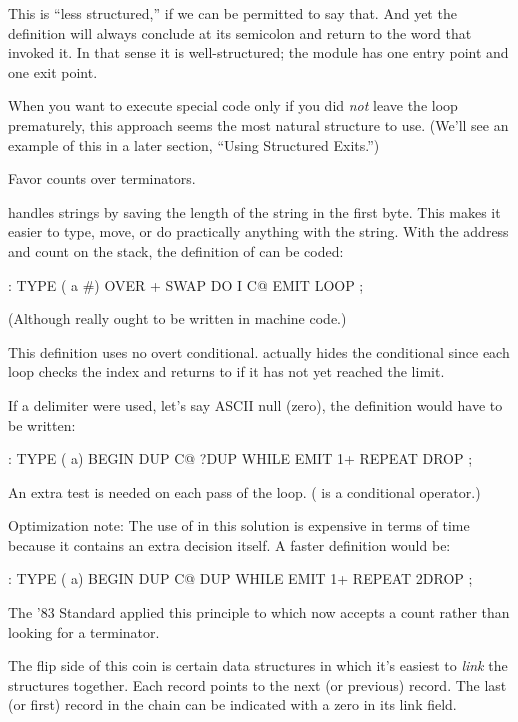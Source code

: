 This is ``less structured,'' if we can be permitted to say that. And
yet the definition will always conclude at its semicolon and return to the
word that invoked it. In that sense it is well-structured; the module has
one entry point and one exit point.

When you want to execute special code only if you did \emph{not} leave the
loop prematurely, this approach seems the most natural structure to use.
(We'll see an example of this in a later section, ``Using Structured
Exits.'')
%
\begin{tip}
Favor counts over terminators.
\end{tip}
\Forth{} handles strings by saving the length of the string in the first
byte. This makes it easier to type, move, or do practically anything with
the string. With the address and count on the stack, the definition of
 can be coded:

\begin{Code}
: TYPE  ( a #)  OVER + SWAP DO  I C@ EMIT  LOOP ;
\end{Code}
(Although  really ought to be written in machine code.)

This definition uses no overt conditional.  actually hides the
conditional since each loop checks the index and returns to  if it
has not yet reached the limit.

If a delimiter were used, let's say ASCII null (zero), the definition
would have to be written:

\begin{Code}
: TYPE  ( a)  BEGIN DUP C@  ?DUP WHILE  EMIT  1+
   REPEAT  DROP ;
\end{Code}
An extra test is needed on each pass of the loop. ( is a conditional
operator.)

Optimization note: The use of  in this solution is expensive in
terms of time because it contains an extra decision itself. A faster
definition would be:

\begin{Code}
: TYPE  ( a)  BEGIN DUP C@  DUP WHILE EMIT 1+
    REPEAT  2DROP ;
\end{Code}
The '83 Standard applied this principle to  which now accepts
a count rather than looking for a terminator.

The flip side of this coin is certain data structures in which it's
easiest to \emph{link} the structures together. Each record points to the next
(or previous) record. The last (or first) record in the chain can be indicated
with a zero in its link field.

